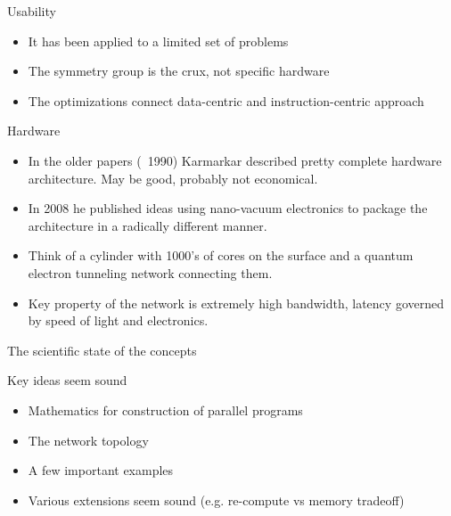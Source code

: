 \documentclass{beamer}
\begin{document}
\begin{frame}{Usability}
\begin{itemize}
\item It has been applied to a limited set of problems
\item The symmetry group is the crux, not specific hardware
\item The optimizations connect data-centric and instruction-centric approach
\end{itemize}
\end{frame}

\begin{frame}{Hardware}
\begin{itemize}
\item
In the older papers (~1990) Karmarkar described pretty complete hardware architecture.  May be good, probably not economical.
\item
In 2008 he published ideas using nano-vacuum electronics to package the architecture in a radically different manner.
\item
Think of a cylinder with 1000's of cores on the surface and a quantum electron tunneling network connecting them.
\item
Key property of the network is extremely high bandwidth, latency governed by speed of light and electronics.
\end{itemize}
\end{frame}

\begin{frame}{The scientific state of the concepts}

\begin{block}{Key ideas seem sound}
\begin{itemize}
\item Mathematics for construction of parallel programs
\item The network topology
\item A few important examples
\item Various extensions seem sound (e.g. re-compute vs memory tradeoff)
\end{itemize}
\end{block}
\end{frame}
\end{document}
